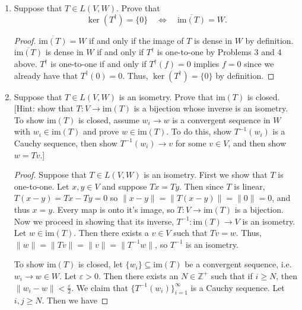 \documentclass[11pt,oneside,english]{amsart}
\theoremstyle{definition}
\newcommand{\ve}{\varepsilon}
\newcommand{\MB}[1]{\mathbb{#1}}
\begin{document}
\begin{enumerate}
\begin{proof}
By Theorem 5.8(a) in Folland's text, there exists an $f\in W^*$ such that $f(w)\neq 0$, and $f\big|_{\overline{\text{im}(T)}}=0$. Consequently, since $T^\dagger(f)=f(Tv)$ for all $v\in V$, $T^\dagger(f)=0$ since $Tv\in\overline{\text{im}(T)}$. Since $T^\dagger(0)=0$ as well, $T^\dagger$ cannot be one-to-one.
\end{proof}


\item Suppose that $T \in L(V,W)$.  Prove that
\[     \ker(T^\dagger) = \{0\}  \quad \iff \quad \overline{\text{im}(T)} = W  .\]

\begin{proof}
$\overline{\text{im}(T)}=W$ if and only if the image of $T$ is dense in $W$ by definition. $\overline{\text{im}(T)}$ is dense in $W$ if and only if $T^\dagger$ is one-to-one by Problems 3 and 4 above. $T^\dagger$ is one-to-one if and only if $T^\dagger(f)=0$ implies $f=0$ since we already have that $T^\dagger(0)=0$. Thus, $\ker(T^\dagger)=\{0\}$ by definition.
\end{proof}

\pagebreak

\item Suppose that $T \in L(V,W)$ is an isometry.  Prove that $\text{im}(T)$ is closed. [Hint: show that $T : V \to \text{im}(T)$ is a bijection whose inverse is an isometry.   To show $\text{im}(T)$ is closed, assume $w_i \to w$ is a convergent sequence in $W$ with $w_i \in \text{im}(T)$ and prove $w \in \text{im}(T)$.  To do this, show $T^{-1} (w_i)$ is a Cauchy sequence, then show $T^{-1} (w_i) \to v$ for some $v \in V$, and then show $w = Tv$.]

\begin{proof}
Suppose that $T\in L(V,W)$ is an isometry. First we show that $T$ is one-to-one. Let $x,y\in V$ and suppose $Tx=Ty$. Then since $T$ is linear, $T(x-y)=Tx-Ty=0$ so $\|x-y\|=\|T(x-y)\|=\|0\|=0$, and thus $x=y$. Every map is onto it's image, so $T:V\to\text{im}(T)$ is a bijection. Now we proceed in showing that its inverse, $T^{-1}:\text{im}(T)\to V$ is an isometry. Let $w\in\text{im}(T)$. Then there exists a $v\in V$ such that $Tv=w$. Thus, $\|w\|=\|Tv\|=\|v\|=\|T^{-1}w\|$, so $T^{-1}$ is an isometry.

To show $\text{im}(T)$ is closed, let $\{w_i\}\subseteq \text{im}(T)$ be a convergent sequence, i.e. $w_i\to w\in W$. Let $\ve>0$. Then there exists an $N\in\MB{Z}^+$ such that if $i\geq N$, then $\|w_i-w\|<\frac{\ve}{2}$. We claim that $\{T^{-1}(w_i)\}_{i=1}^\infty$ is a Cauchy sequence. Let $i,j\geq N$. Then we have


\end{proof}
\end{enumerate}
\end{document}

